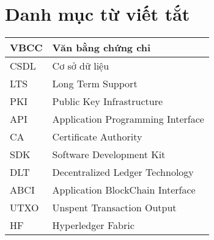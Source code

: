 \chapter*{Danh mục từ viết tắt}
\begin{center}
\renewcommand{\arraystretch}{1.5}
\begin{longtable}{ |l @{\qquad} |l| }
\hline
VBCC   & Văn bằng chứng chỉ  \\ \hline
CSDL   & Cơ sở dữ liệu  \\ \hline
LTS  &  Long Term Support  \\ \hline
PKI  &  Public Key Infrastructure \\ \hline
API    & Application Programming Interface  \\ \hline
CA    & Certificate Authority \\ \hline
SDK    & Software Development Kit \\ \hline
DLT & Decentralized Ledger Technology \\ \hline
ABCI & Application BlockChain Interface \\ \hline
UTXO & Unspent Transaction Output \\ \hline 
HF & Hyperledger Fabric  \\ \hline

\end{longtable}
\end{center}
